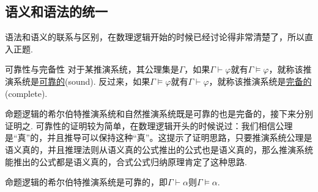 \vspace{1cm}

\subsection{语义和语法的统一}


语法和语义的联系与区别，在数理逻辑开始的时候已经讨论得非常清楚了，所以直入正题.

\begin{definition}{可靠性与完备性}
    对于某推演系统，其公理集是\(\Gamma\)，如果\(\Gamma \vdash \varphi\)就有\(\Gamma \vDash \varphi\)，就称该推演系统是\underline{可靠的}(sound). \newline
    反过来，如果\(\Gamma \vDash \varphi\)就有\(\Gamma \vdash \varphi\)，就称该推演系统是\underline{完备的}(complete).
\end{definition}

命题逻辑的希尔伯特推演系统和自然推演系统既是可靠的也是完备的，接下来分别证明之. 可靠性的证明较为简单，在数理逻辑开头的时候说过：我们相信公理是“真”的，并且推导可以保持这种“真”。这提示了证明思路，只要推演系统公理是语义真的，并且推理法则从语义真的公式推出的公式也是语义真的，那么推演系统能推出的公式都是语义真的，合式公式归纳原理肯定了这种思路.

\begin{theorem}{}
    命题逻辑的希尔伯特推演系统是可靠的，即\(\Gamma \vdash \alpha\)则\(\Gamma \vDash \alpha\).
\end{theorem}

